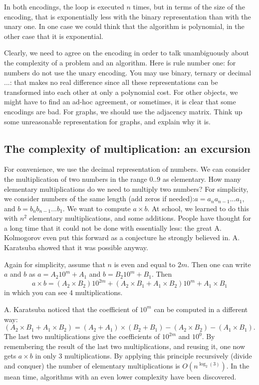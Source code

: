 In both encodings, the loop is executed $n$ times, but in terms of the
size of the encoding, that is exponentially less with the binary
representation than with the unary one. In one case we could think
that the algorithm is polynomial, in the other case that it is
exponential.

Clearly, we need to agree on the encoding in order to talk
unambiguously about the complexity of a problem and an algorithm. Here
is rule number one: for numbers do not use the unary encoding. You may
use binary, ternary or decimal ...: that makes no real difference
since all these representations can be transformed into each other at
only a polynomial cost. For other objects, we might have to find an
ad-hoc agreement, or sometimes, it is clear that some encodings are
bad. For graphs, we should use the adjacency matrix. Think up some
unreasonable representation for graphs, and explain why it is.


\subsection{The complexity of multiplication: an excursion}

For convenience, we use the decimal representation of numbers.
We can consider the multiplication of two numbers in the range $0..9$
as elementary. How many elementary multiplications do we need to
multiply two numbers? For simplicity, we consider numbers of the same
length (add zeros if needed):$a= a_na_{n-1}...a_1$, and
$b = b_nb_{n-1}...b_1$. We want to compute $a \times b$. At school, we
learned to do this with $n^2$ elementary multiplications, and some
additions. People have thought for a long time that it could not be
done with essentially less: the great A. Kolmogorov even put this
forward as a conjecture he strongly believed in. A. Karatsuba showed
that it was possible anyway.

Again for simplicity, assume that $n$ is even and equal to $2m$. Then
one can write $a$ and $b$ as
%
$a = A_{2}10^m + A_1$ and $b = B_{2}10^m + B_1$.
%
Then
\begin{equation*}
	a \times b = (A_{2}\times B_{2})10^{2m} + (A_{2}\times B_1 + A_1\times B_{2})10^m + A_1\times B_1
\end{equation*}
in which you can see 4 multiplications.

A. Karatsuba noticed that the coefficient of $10^m$ can be computed in
a different way:
\begin{equation*}
	(A_{2}\times B_1 + A_1\times B_{2}) = (A_{2} + A_1) \times (B_{2} +
B_1) - (A_{2}\times B_{2}) - (A_1\times B_1).
\end{equation*}
The last two multiplications give the coefficients of $10^{2m}$ and
$10^0$. By remembering the result of the last two multiplications, and
reusing it, one now gets $a \times b$ in only 3 multiplications.
By applying this principle recursively (divide and conquer) the number
of elementary multiplications is $O(n^{\log_2(3)})$. In the mean time,
algorithms with an even lower complexity have been discovered.

